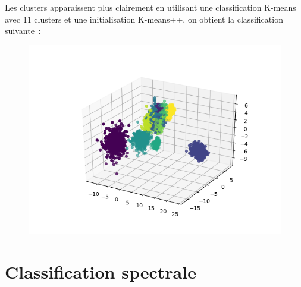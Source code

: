 \documentclass[12pt]{scrartcl} %
\begin{document}
Les clusters apparaissent plus clairement en utilisant une classification K-means avec 11 clusters et une initialisation K-means++, on obtient la classification suivante~:
\newline
\begin{figure}[!h]
 \centering 
\includegraphics[scale=.3]{kmeans_AFD8.png}
\end{figure}
\newline 
\section{Classification spectrale}
\end{document}
